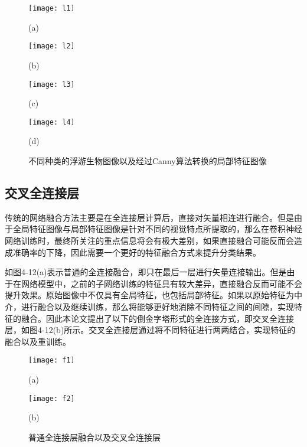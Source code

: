 \begin{figure}[H]
\centering
\begin{minipage}[b]{0.45\linewidth} 
      \centering 
      \texttt{[image: l1]}
        \centerline{(a) }\medskip
\end{minipage}
  \begin{minipage}[b]{0.45\linewidth}
    \centering
    \texttt{[image: l2]}
      \centerline{(b) }\medskip
  \end{minipage}
    \begin{minipage}[b]{0.45\linewidth}
    \centering
    \texttt{[image: l3]}
      \centerline{(c) }\medskip
  \end{minipage}
  \begin{minipage}[b]{0.45\linewidth}
    \centering
    \texttt{[image: l4]}
      \centerline{(d) }\medskip
  \end{minipage}
 \caption{不同种类的浮游生物图像以及经过Canny算法转换的局部特征图像}
\label{fig:texture}
\end{figure}


\subsection{交叉全连接层}

传统的网络融合方法主要是在全连接层计算后，直接对矢量相连进行融合。但是由于全局特征图像与局部特征图像是针对不同的视觉特点所提取的，那么在卷积神经网络训练时，最终所关注的重点信息将会有极大差别，如果直接融合可能反而会造成准确率的下降，因此需要一个更好的特征融合方式来提升分类结果。



如图4-12(a)表示普通的全连接融合，即只在最后一层进行矢量连接输出。但是由于在网络模型中，之前的子网络训练的特征具有较大差异，直接融合反而可能不会提升效果。原始图像中不仅具有全局特征，也包括局部特征。如果以原始特征为中介，进行融合以及继续训练，那么将能够更好地消除不同特征之间的间隙，实现特征的融合。因此本论文提出了以下的倒金字塔形式的全连接方式，即交叉全连接层，如图4-12(b)所示。交叉全连接层通过将不同特征进行两两结合，实现特征的融合以及重训练。

\begin{figure}[H]
\centering
\begin{minipage}[]{0.8\linewidth} 
      \centering 
      \texttt{[image: f1]}
        \centerline{(a) }\medskip
\end{minipage}
  \begin{minipage}[]{0.8\linewidth}
    \centering
    \texttt{[image: f2]}
      \centerline{(b) }\medskip
  \end{minipage}
 \caption{普通全连接层融合以及交叉全连接层}
\end{figure}


